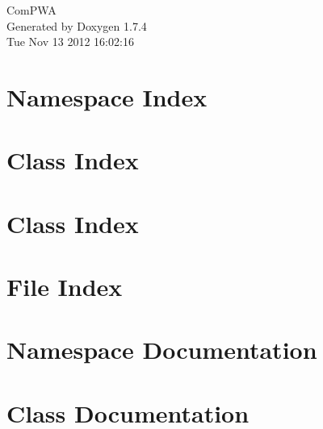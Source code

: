 \documentclass[a4paper]{book}
\begin{document}
\hypersetup{pageanchor=false}
\begin{titlepage}
\vspace*{7cm}
\begin{center}
{\Large ComPWA }\\
\vspace*{1cm}
{\large Generated by Doxygen 1.7.4}\\
\vspace*{0.5cm}
{\small Tue Nov 13 2012 16:02:16}\\
\end{center}
\end{titlepage}
\clearemptydoublepage
{}
\tableofcontents
\clearemptydoublepage
{}
\hypersetup{pageanchor=true}
\chapter{Namespace Index}

\chapter{Class Index}

\chapter{Class Index}

\chapter{File Index}

\chapter{Namespace Documentation}




\chapter{Class Documentation}



















\end{document}
